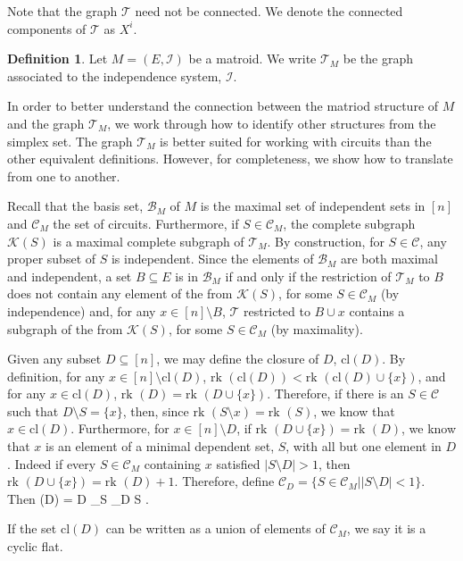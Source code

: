 \documentclass[11pt]{article}
\newcommand{\rk}{\textrm{rk }}
\newcommand{\cl}{\textrm{cl}}
\def\ba #1\ea{\begin{align} #1 \end{align}}
\newcommand{\sI}{\mathscr{I}}
\newcommand{\cC}{\mathcal{C}}
\newcommand{\cB}{\mathcal{B}}
\newcommand{\cK}{\mathcal{K}}
\newcommand{\cT}{\mathcal{T}}
\theoremstyle{remark}
\theoremstyle{definition}
\newtheorem{dfn}[thm]{Definition}
\begin{document}
Note that the graph $\cT$ need not be connected. We denote the connected components of $\cT$ as $X^i$. 

\begin{dfn}
	Let $M = (E, \sI)$ be a matroid. We write $\cT_M$ be the graph associated to the independence system, $\sI$.
\end{dfn}

In order to better understand the connection between the matriod structure of $M$ and the graph $\cT_M$, we work through how to identify other structures from the simplex set. The graph $\cT_M$ is better suited for working with circuits than the other equivalent definitions. However, for completeness, we show how to translate from one to another.

Recall that the basis set, $\cB_M$ of $M$ is the maximal set of independent sets in $[n]$ and $\cC_M$ the set of circuits. Furthermore, if $S \in \cC_M$, the complete subgraph $\cK(S)$ is a maximal complete subgraph of $\cT_M$. By construction, for $S \in \cC$, any proper subset of $S$ is independent. Since the elements of $\cB_M$ are both maximal and independent, a set $B \subseteq E$ is in $\cB_M$ if and only if the restriction of $\cT_M$ to $B$ does not contain any element of the from $\cK(S)$, for some $S \in \cC_M$ (by independence) and, for any $x \in [n] \setminus B$, $\cT$ restricted to $B \cup x$ contains a subgraph of the from $\cK(S)$, for some $S \in \cC_M$ (by maximality).

Given any subset $D \subseteq [n]$, we may define the closure of $D$, $\cl(D)$. By definition, for any $x \in [n] \setminus \cl(D)$, $\rk(\cl(D)) < \rk(\cl(D) \cup \{x\})$, and for any $x \in \cl(D)$, $\rk(D) = \rk(D \cup \{x\})$. Therefore, if there is an $S \in \cC$ such that $D \setminus S = \{x\}$, then, since $\rk(S \setminus x) = \rk(S)$, we know that $x \in \cl(D)$. Furthermore, for $x \in [n] \setminus D$, if $\rk(D \cup \{x\}) = \rk(D)$, we know that $x$ is an element of a minimal dependent set, $S$, with all but one element in $D$. Indeed if every $S \in \cC_M$ containing $x$ satisfied $|S \setminus D| >1$, then $\rk(D \cup \{x\}) = \rk(D) +1$. Therefore, define $\cC_D = \{S \in \cC_M | |S \setminus D| <1 \}$. Then \ba \cl(D) = D \bigcup_{S \in \cC_D} S \label{eq:graphicclosure}.\ea


If the set $\cl(D)$ can be written as a union of elements of $\cC_M$, we say it is a cyclic flat.
\end{document}
